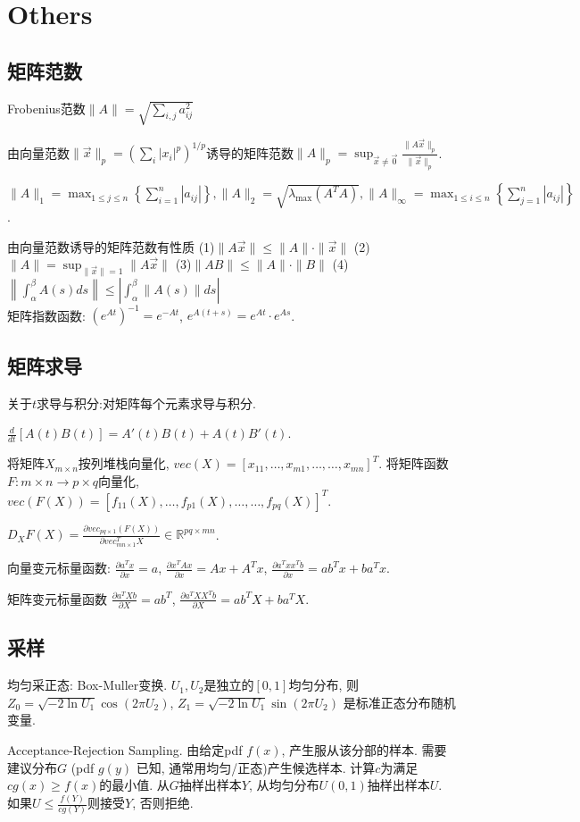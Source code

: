 \documentclass[UTF8]{ctexart}
\begin{document}
\section{Others}

\subsection{矩阵范数}

Frobenius范数$\| A\|=\sqrt{\sum_{i,j}a_{ij}^2}$

由向量范数$\| \vec{x}\| _p=(\sum _i |x_i|^p)^{1/p}$诱导的矩阵范数$\| A\|_p=\operatorname{sup}
	_{\vec{x}\neq \vec{0}} \frac{\| A\vec{x} \|_p}{\| \vec{x} \|_p}$.


$\|A\|_{1}=\max _{1 \leqslant j \leqslant n}\left\{\sum_{i=1}^{n}\left|a_{i j}\right|\right\},
	\|A\|_{2}=\sqrt{\lambda_{\max} \left(A^T A\right)},
	\|A\|_{\infty}=\max _{1 \leqslant i \leqslant n}\left\{\sum_{j=1}^{n}\left|a_{i j}\right|\right\}$. \par

由向量范数诱导的矩阵范数有性质
(1)$\|A \vec{x}\| \leqslant\|A\| \cdot\|\vec{x}\|$ \quad
(2)$\|A\|=\sup _{\|\vec{x}\|=1}\|A \vec{x}\|$ \quad
(3)$\|A B\| \leqslant\|A\| \cdot\|B\|$ \quad
(4)$\left\|\int_{\alpha}^{\beta} A(s) d s\right\| \leqslant\left|\int_{\alpha}^{\beta}\|A(s)\| d s\right|$
~\\

矩阵指数函数: $(e^{At})^{-1}=e^{-At}$, $e^{A(t+s)}=e^{At}\cdot e^{As}$.


\subsection{矩阵求导}
关于$t$求导与积分:对矩阵每个元素求导与积分.

$\frac{d}{dt}[A(t)B(t)]=A'(t)B(t)+A(t)B'(t)$.

将矩阵$X_{m\times n}$按列堆栈向量化, $vec(X)=[x_{11},\dots,x_{m1},\dots,\dots,x_{mn}]^T$.
将矩阵函数$F:m\times n\to p\times q$向量化, $vec(F(X))=[f_{11}(X),\dots,f_{p1}(X),\dots,\dots,f_{pq}(X)]^T$.

$D_X F(X)=\frac{\partial vec_{pq\times 1}(F(X))}{\partial vec_{mn\times 1}^T X} \in \mathbb{R}^{pq\times mn}$.


向量变元标量函数:
$\frac{\partial a^Tx}{\partial x}=a$,
$\frac{\partial x^TAx}{\partial x}=Ax+A^Tx$,
$\frac{\partial a^T xx^T b}{\partial x}=ab^Tx+ba^Tx$.

矩阵变元标量函数
$\frac{\partial a^T X b}{\partial X}=ab^T$,
$\frac{\partial a^T XX^T b}{\partial X}=ab^TX+ba^TX$.

\subsection{采样}

均匀采正态: Box-Muller变换. $U_1, U_2$是独立的$[0, 1]$均匀分布,
则$Z_0=\sqrt{-2\ln U_1}\cos(2\pi U_2)$, $Z_1=\sqrt{-2\ln U_1}\sin(2\pi U_2)$
是标准正态分布随机变量.

Acceptance-Rejection Sampling.
由给定pdf $f(x)$, 产生服从该分部的样本.
需要建议分布$G$ (pdf $g(y)$ 已知, 通常用均匀/正态)产生候选样本.
计算$c$为满足$cg(x)\geq f(x)$的最小值.
从$G$抽样出样本$Y$, 从均匀分布$U(0,1)$抽样出样本$U$.
如果$U\leq\frac{f(Y)}{cg(Y)}$则接受$Y$, 否则拒绝.
\end{document}
